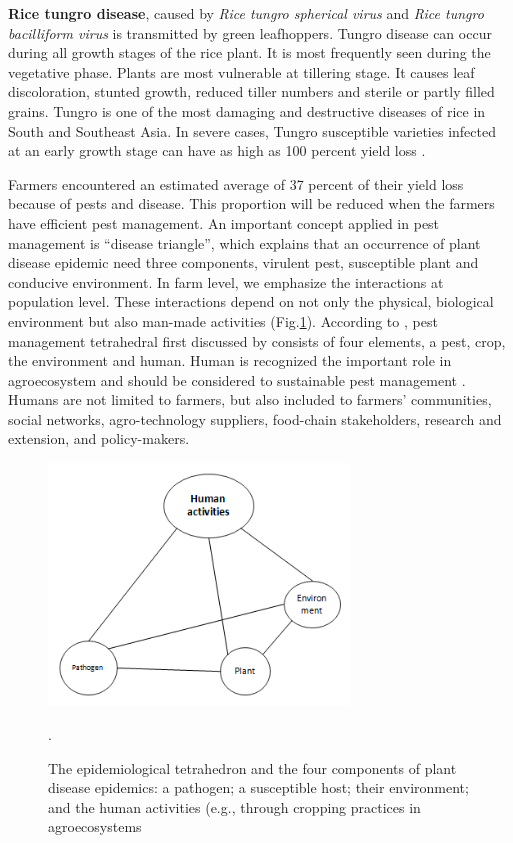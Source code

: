 \documentclass[12pt, oneside]{report}
\begin{document}
\textbf{Rice tungro disease}, caused by \textit{Rice tungro spherical virus} and \textit{Rice tungro bacilliform virus} is transmitted by green leafhoppers. Tungro disease can occur during all growth stages of the rice plant. It is most frequently seen during the vegetative phase. Plants are most vulnerable at tillering stage. It causes leaf discoloration, stunted growth, reduced tiller numbers and sterile or partly filled grains. Tungro is one of the most damaging and destructive diseases of rice in South and Southeast Asia. In severe cases, Tungro susceptible varieties infected at an early growth stage can have as high as 100 percent yield loss \citep{ouricedisease}.

Farmers encountered an estimated average of 37 percent of their yield loss because of pests and disease. This proportion will be reduced when the farmers have efficient pest management. An important concept applied in pest management is ``disease triangle'', which explains that an occurrence of plant disease epidemic need three components, virulent pest, susceptible plant and conducive environment. In farm level, we emphasize the interactions at population level. These interactions depend on not only the physical, biological environment but also man-made activities (Fig.\ref{fig:diseasetriangle}). According to \citet{Savary:2006to}, pest management tetrahedral first discussed by \cite{Zadoks:1979ts} consists of four elements, a pest, crop, the environment and human. Human is recognized the important role in agroecosystem and should be considered to sustainable pest management \citep{Zadok1985}. Humans are not limited to farmers, but also included to farmers' communities, social networks, agro-technology suppliers, food-chain stakeholders, research and extension, and policy-makers.

\begin{figure}
\includegraphics[width=8cm]{distriangle}
\centering
\caption{The epidemiological tetrahedron and the four components of plant disease epidemics: a pathogen; a susceptible host; their environment; and the human activities (e.g., through cropping practices in agroecosystems}.
\label{fig:diseasetriangle}
\end{figure}
\end{document}
